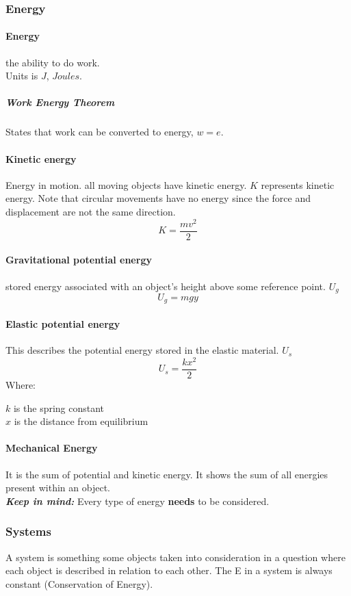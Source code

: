 \documentclass{article} %
\theoremstyle{theorem}
\theoremstyle{definition}
\begin{document}
        \subsubsection{Energy}
            \paragraph{Energy}
                the ability to do work.\\ Units is $J$, $Joules$.
                \subparagraph{Work Energy Theorem}
                    States that work can be converted to energy, $w=e$.
            \paragraph{Kinetic energy}
                Energy in motion. all moving objects have kinetic energy. $K$ represents kinetic energy.
                Note that circular movements have no energy since the force and displacement are not the same direction.
                $$K=\frac{mv^2}{2}$$ 
            \paragraph{Gravitational potential energy}%
            \label{par:Gravitational potential energy}
                stored energy associated with an object's height above some reference point. $U_g$
                \begin{equation}
                    U_g=mgy
                \end{equation}
            \paragraph{Elastic potential energy}
                This describes the potential energy stored in the elastic material. $U_s$
                \begin{equation}
                    U_s=\frac{kx^2}{2}
                \end{equation}
                Where:\begin{center} $k$ is the spring constant\\$x$ is the distance from equilibrium \end{center}
            \paragraph{Mechanical Energy}
            It is the sum of potential and kinetic energy. It shows the sum of all energies present within an object.
            \\\emph{\textbf{Keep in mind:}} Every type of energy \textbf{needs} to be considered.
        \subsubsection{Systems}
            A system is something some objects taken into consideration in a question where each object is described in relation to each other.
            The E in a system is always constant (Conservation of Energy).
\end{document}
